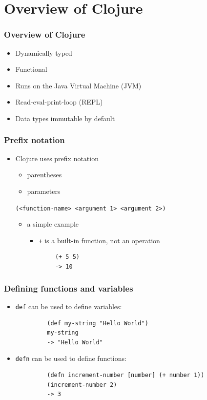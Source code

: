 \documentclass{beamer}
\begin{document}
\section{Overview of Clojure}

\begin{frame}
\frametitle{Overview of Clojure}
	\begin{itemize}
  	 \item Dynamically typed
  	 \item Functional
  	 \item Runs on the Java Virtual Machine (JVM)
  	 \item Read-eval-print-loop (REPL)
  	 \item Data types immutable by default
	 \end{itemize}
\end{frame}

\begin{frame}[fragile]
\frametitle{Prefix notation}
	\begin{itemize}
  	  \item Clojure uses prefix notation
  	  \begin{itemize}
  	 	 \item parentheses
  	 	 \item parameters
  	  \end{itemize}
		 
	  \texttt{(<function-name> <argument 1> <argument 2>)}
	  
	  \begin{itemize}
  	 	\item a simple example
  	 	\begin{itemize}
  	 	   \item \texttt{+} is a built-in function, not an operation
  	 	\end{itemize}
  	 	\begin{verbatim}		
		(+ 5 5)
		-> 10
	        \end{verbatim}
  	  \end{itemize}
   \end{itemize}
\end{frame}

\begin{frame}[fragile]
\frametitle{Defining functions and variables}
	\begin{itemize}
  	  \item \texttt{def} can be used to define variables:
  	  \begin{verbatim}
		 (def my-string "Hello World")
		 my-string
		 -> "Hello World"
	  \end{verbatim}
  	  \item \texttt{defn} can be used to define functions:
  	  \begin{verbatim}
		 (defn increment-number [number] (+ number 1))
		 (increment-number 2)
		 -> 3
	  \end{verbatim}
	\end{itemize}
\end{frame}
\end{document}
